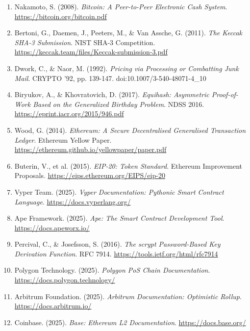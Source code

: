\documentclass[11pt,a4paper]{article}
\begin{document}
\begin{enumerate}
    \item Nakamoto, S. (2008). \textit{Bitcoin: A Peer-to-Peer Electronic Cash System}. \url{https://bitcoin.org/bitcoin.pdf}

    \item Bertoni, G., Daemen, J., Peeters, M., \& Van Assche, G. (2011). \textit{The Keccak SHA-3 Submission}. NIST SHA-3 Competition. \url{https://keccak.team/files/Keccak-submission-3.pdf}

    \item Dwork, C., \& Naor, M. (1992). \textit{Pricing via Processing or Combatting Junk Mail}. CRYPTO '92, pp. 139-147. doi:10.1007/3-540-48071-4\_10

    \item Biryukov, A., \& Khovratovich, D. (2017). \textit{Equihash: Asymmetric Proof-of-Work Based on the Generalized Birthday Problem}. NDSS 2016. \url{https://eprint.iacr.org/2015/946.pdf}

    \item Wood, G. (2014). \textit{Ethereum: A Secure Decentralised Generalised Transaction Ledger}. Ethereum Yellow Paper. \url{https://ethereum.github.io/yellowpaper/paper.pdf}

    \item Buterin, V., et al. (2015). \textit{EIP-20: Token Standard}. Ethereum Improvement Proposals. \url{https://eips.ethereum.org/EIPS/eip-20}

    \item Vyper Team. (2025). \textit{Vyper Documentation: Pythonic Smart Contract Language}. \url{https://docs.vyperlang.org/}

    \item Ape Framework. (2025). \textit{Ape: The Smart Contract Development Tool}. \url{https://docs.apeworx.io/}

    \item Percival, C., \& Josefsson, S. (2016). \textit{The scrypt Password-Based Key Derivation Function}. RFC 7914. \url{https://tools.ietf.org/html/rfc7914}

    \item Polygon Technology. (2025). \textit{Polygon PoS Chain Documentation}. \url{https://docs.polygon.technology/}

    \item Arbitrum Foundation. (2025). \textit{Arbitrum Documentation: Optimistic Rollup}. \url{https://docs.arbitrum.io/}

    \item Coinbase. (2025). \textit{Base: Ethereum L2 Documentation}. \url{https://docs.base.org/}
\end{enumerate}
\end{document}
